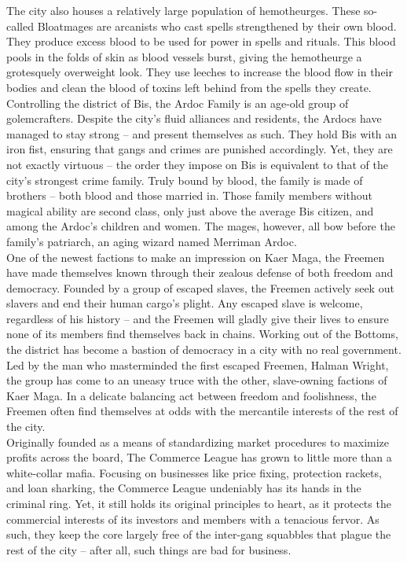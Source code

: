 The city also houses a relatively large population of hemotheurges. These so-called Bloatmages are arcanists who cast spells strengthened by their own blood. They produce excess blood to be used for power in spells and rituals. This blood pools in the folds of skin as blood vessels burst, giving the hemotheurge a grotesquely overweight look. They use leeches to increase the blood flow in their bodies and clean the blood of toxins left behind from the spells they create.\\

Controlling the district of Bis, the Ardoc Family is an age-old group of golemcrafters. Despite the city's fluid alliances and residents, the Ardocs have managed to stay strong -- and present themselves as such. They hold Bis with an iron fist, ensuring that gangs and crimes are punished accordingly. Yet, they are not exactly virtuous -- the order they impose on Bis is equivalent to that of the city's strongest crime family. Truly bound by blood, the family is made of brothers -- both blood and those married in. Those family members without magical ability are second class, only just above the average Bis citizen, and among the Ardoc's children and women. The mages, however, all bow before the family's patriarch, an aging wizard named Merriman Ardoc.\\

One of the newest factions to make an impression on Kaer Maga, the Freemen have made themselves known through their zealous defense of both freedom and democracy. Founded by a group of escaped slaves, the Freemen actively seek out slavers and end their human cargo's plight. Any escaped slave is welcome, regardless of his history -- and the Freemen will gladly give their lives to ensure none of its members find themselves back in chains. Working out of the Bottoms, the district has become a bastion of democracy in a city with no real government. Led by the man who masterminded the first escaped Freemen, Halman Wright, the group has come to an uneasy truce with the other, slave-owning factions of Kaer Maga. In a delicate balancing act between freedom and foolishness, the Freemen often find themselves at odds with the mercantile interests of the rest of the city.\\

Originally founded as a means of standardizing market procedures to maximize profits across the board, The Commerce League has grown to little more than a white-collar mafia. Focusing on businesses like price fixing, protection rackets, and loan sharking, the Commerce League undeniably has its hands in the criminal ring. Yet, it still holds its original principles to heart, as it protects the commercial interests of its investors and members with a tenacious fervor. As such, they keep the core largely free of the inter-gang squabbles that plague the rest of the city -- after all, such things are bad for business.\\

